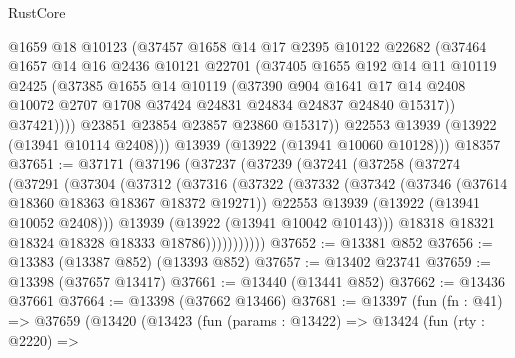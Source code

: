 \begin{lexlean}{RustCore}
\begin{coremodule}
              @1659
              @18
              @10123
              (@37457
                @1658
                @14
                @17
                @2395
                @10122
                @22682
                (@37464
                  @1657
                  @14
                  @16
                  @2436
                  @10121
                  @22701
                  (@37405
                    @1655
                    @192
                    @14
                    @11
                    @10119
                    @2425
                    (@37385
                      @1655
                      @14
                      @10119
                      (@37390
                        @904
                        @1641
                        @17
                        @14
                        @2408
                        @10072
                        @2707
                        @1708
                        @37424
                        @24831
                        @24834
                        @24837
                        @24840
                        @15317))
                    @37421))))
            @23851
            @23854
            @23857
            @23860
            @15317))
        @22553
        @13939
        (@13922 (@13941 @10114 @2408)))
      @13939
      (@13922 (@13941 @10060 @10128)))
    @18357
@37651 := @37171
    (@37196
      (@37237
        (@37239
          (@37241
            (@37258
              (@37274
                (@37291
                  (@37304
                    (@37312
                      (@37316
                        (@37322
                          (@37332
                            (@37342
                              (@37346 (@37614 @18360 @18363 @18367 @18372 @19271))
                              @22553
                              @13939
                              (@13922 (@13941 @10052 @2408)))
                            @13939
                            (@13922 (@13941 @10042 @10143)))
                          @18318
                          @18321
                          @18324
                          @18328
                          @18333
                          @18786)))))))))))
@37652 := @13381 @852
@37656 := @13383 (@13387 @852) (@13393 @852)
@37657 := @13402 @23741
@37659 := @13398 (@37657 @13417)
@37661 := @13440 (@13441 @852)
@37662 := @13436 @37661
@37664 := @13398 (@37662 @13466)
@37681 := @13397
    (fun (fn : @41) =>
    @37659
      (@13420
        (@13423
          (fun (params : @13422) =>
          @13424
            (fun (rty : @2220) =>

\end{coremodule}
\end{lexlean}
